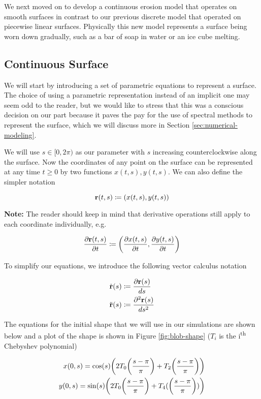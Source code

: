 
We next moved on to develop a continuous erosion model that operates on smooth surfaces in contrast to our previous discrete model that operated on piecewise linear surfaces. Physically this new model represents a surface being worn down gradually, such as a bar of soap in water or an ice cube melting. 

\subsection*{Continuous Surface}

We will start by introducing a set of parametric equations to represent a surface. The choice of using a parametric representation instead of an implicit one may seem odd to the reader, but we would like to stress that this was a conscious decision on our part because it paves the pay for the use of spectral methods to represent the surface, which we will discuss more in Section \ref{sec:numerical-modeling}. 

We will use $s \in [0, 2\pi)$ as our parameter with $s$ increasing counterclockwise along the surface. Now the coordinates of any point on the surface can be represented at any time $t \ge 0$ by two functions $x(t, s), y(t, s)$. We can also define the simpler notation

\[ 
  \bvec{r}(t, s) \coloneqq \paren{x(t, s), y(t, s)}
\]

\textbf{Note:} The reader should keep in mind that derivative operations still apply to each coordinate individually, e.g.

\[
  \frac{\partial \bvec{r}(t, s)}{\partial t} \coloneqq \paren{\frac{\partial x(t, s)}{\partial t}, \frac{\partial y(t, s)}{\partial t}}
\]

To simplify our equations, we introduce the following vector calculus notation

\begin{align*}
  \dot{\mathbf{r}}(s)& \coloneqq \frac{\partial \mathbf{r}(s)}{ds}\\
  \ddot{\mathbf{r}}(s)& \coloneqq \frac{\partial^2 \mathbf{r}(s)}{ds^2}
\end{align*}

The equations for the initial shape that we will use in our simulations are shown below and a plot of the shape is shown in Figure \ref{fig:blob-shape} ($T_i$ is the i\textsuperscript{th} Chebyshev polynomial)

\begin{align*}
  x(0, s) = \cos(s) \paren{2 T_0\paren{\frac{s-\pi}{\pi}} + T_2\paren{\frac{s-\pi}{\pi}}}\\
  y(0, s) = \sin(s) \paren{2 T_0\paren{\frac{s-\pi}{\pi}} + T_4(\paren{\frac{s-\pi}{\pi}})}
\end{align*}

